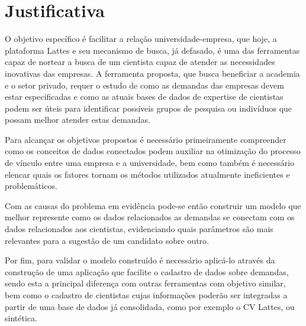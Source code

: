 \section{Justificativa}\label{sec:justificativa}

O objetivo específico é facilitar a relação universidade-empresa, que hoje, a plataforma Lattes e seu mecanismo de busca, já defasado, é uma das ferramentas capaz de nortear a busca de um cientista capaz de atender as necessidades inovativas das empresas. A ferramenta proposta, que busca beneficiar a academia e o setor privado, requer o estudo de como as demandas das empresas devem estar especificadas e como as atuais bases de dados de expertise de cientistas podem ser úteis para identificar possíveis grupos de pesquisa ou indivíduos que possam melhor atender estas demandas.

Para alcançar os objetivos propostos é necessário primeiramente compreender como os conceitos de dados conectados podem auxiliar na otimização do processo de vínculo entre uma empresa e a universidade, bem como também é necessário elencar quais os fatores tornam os métodos utilizados atualmente ineficientes e problemáticos.

Com as causas do problema em evidência pode-se então construir um modelo que melhor represente como os dados relacionados as demandas se conectam com os dados relacionados aos cientistas, evidenciando quais parâmetros são mais relevantes para a sugestão de um candidato sobre outro. 

Por fim, para validar o modelo construído é necessário aplicá-lo através da construção de uma aplicação que facilite o cadastro de dados sobre demandas, sendo esta a principal diferença com outras ferramentas com objetivo similar, bem como o cadastro de cientistas cujas informações poderão ser integradas a partir de uma base de dados já consolidada, como por exemplo o CV Lattes, ou sintética.



